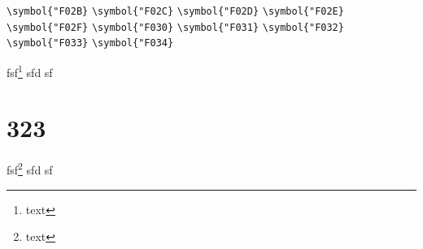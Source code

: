 \documentclass{ctexbook}
\begin{document}
{\verb|\symbol{"F02B}|  \verb|\symbol{"F02C}|  \verb|\symbol{"F02D}|  \verb|\symbol{"F02E}|  \verb|\symbol{"F02F}|  \verb|\symbol{"F030}|  \verb|\symbol{"F031}|  \verb|\symbol{"F032}|  \verb|\symbol{"F033}|  \verb|\symbol{"F034}| 
}

fsf\footnote[89]{text} sfd sf
\chapter{323}
fsf\footnote{text} sfd sf
\end{document}
